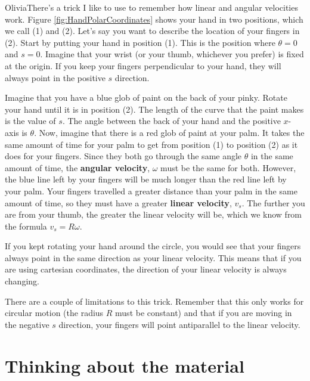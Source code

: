 \begin{studentOpinion}{Olivia}There's a trick I like to use to remember how linear and angular velocities work. Figure \ref{fig:HandPolarCoordinates} shows your hand in two positions, which we call (1) and (2). Let's say you want to describe the location of your fingers in (2). Start by putting your hand in position (1). This is the position where $\theta=0$ and $s=0$. Imagine that your wrist (or your thumb, whichever you prefer) is fixed at the origin. If you keep your fingers perpendicular to your hand, they will always point in the positive $s$ direction. 

Imagine that you have a blue glob of paint on the back of your pinky. Rotate your hand until it is in position (2). The length of the curve that the paint makes is the value of $s$. The angle between the back of your hand and the positive $x$-axis is $\theta$. Now, imagine that there is a red glob of paint at your palm. It takes the same amount of time for your palm to get from position (1) to position (2) as it does for your fingers. Since they both go through the same angle $\theta$ in the same amount of time, the \textbf{angular velocity}, $\omega$ must be the same for both. However, the blue line left by your fingers will be much longer than the red line left by your palm. Your fingers travelled a greater distance than your palm in the same amount of time, so they must have a greater \textbf{linear velocity}, $v_s$. The further you are from your thumb, the greater the linear velocity will be, which we know from the formula $v_s=R\omega$.

If you kept rotating your hand around the circle, you would see that your fingers always point in the same  direction as your linear velocity. This means that if you are using cartesian coordinates, the direction of your linear velocity is always changing.

There are a couple of limitations to this trick. Remember that this only works for circular motion (the radius $R$ must be constant) and that if you are moving in the negative $s$ direction, your fingers will point antiparallel to the linear velocity.

\end{studentOpinion}


\newpage
\section{Thinking about the material}
